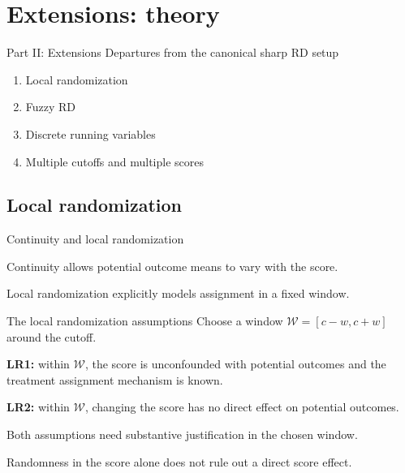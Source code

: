 \section{Extensions: theory}
\begin{frame}[plain]{Part II: Extensions}
\Large Departures from the canonical sharp RD setup
\vspace{1em}\normalsize
\begin{enumerate}\setlength{\itemsep}{.7em}
\item Local randomization
\item Fuzzy RD
\item Discrete running variables
\item Multiple cutoffs and multiple scores
\end{enumerate}
\end{frame}

\subsection{Local randomization}
\begin{frame}{Continuity and local randomization}
\begin{items}
\item Continuity allows potential outcome means to vary with the score.
\item Local randomization explicitly models assignment in a fixed window.
\end{items}
\end{frame}

\begin{frame}{The local randomization assumptions}
Choose a window $\mathcal W=[c-w,c+w]$ around the cutoff.
\begin{items}
\item \textbf{LR1:} within $\mathcal W$, the score is unconfounded with potential outcomes and the treatment assignment mechanism is known.
\item \textbf{LR2:} within $\mathcal W$, changing the score has no direct effect on potential outcomes.
\item Both assumptions need substantive justification in the chosen window.
\item Randomness in the score alone does not rule out a direct score effect.
\end{items}
\end{frame}

